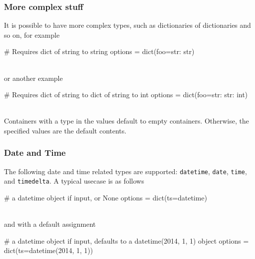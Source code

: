 \subsubsection*{More complex stuff}
It is possible to have more complex types, such as dictionaries of
dictionaries and so on, for example
\\
\begin{pythonBEG}
  # Requires dict of string to string
  options = dict(foo={str: str})
\end{pythonBEG}
\\
or another example
\\
\begin{pythonEND}
  # Requires dict of string to dict of string to int
  options = dict(foo={str: {str: int}})
\end{pythonEND}
\\
Containers with a type in the values default to empty containers.
Otherwise, the specified values are the default contents.



\subsubsection*{Date and Time}
The following date and time related types are supported:
\texttt{datetime}, \texttt{date}, \texttt{time}, and
\texttt{timedelta}.  A typical usecase is as follows
\\
\begin{pythonBEG}
  # a datetime object if input, or None
  options = dict(ts=datetime)
\end{pythonBEG}
\\
and with a default assignment
\\
\begin{pythonEND}
  #  a datetime object if input, defaults to a datetime(2014, 1, 1) object
  options = dict(ts=datetime(2014, 1, 1))
\end{pythonEND}



